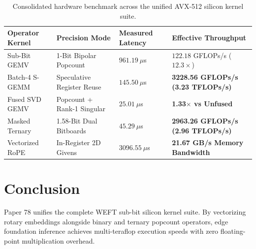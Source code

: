 \documentclass[11pt,a4paper]{article}
\begin{document}
\begin{table}[h!]
\centering
\begin{tabular}{@{}llll@{}}
\toprule
\textbf{Operator Kernel} & \textbf{Precision Mode} & \textbf{Measured Latency} & \textbf{Effective Throughput} \\ \midrule
Sub-Bit GEMV & 1-Bit Bipolar Popcount & $961.19\ \mu$s & $122.18$ GFLOPs/s ($12.3\times$) \\
Batch-4 S-GEMM & Speculative Register Reuse & $145.50\ \mu$s & \textbf{3228.56 GFLOPs/s (3.23 TFLOPs/s)} \\
Fused SVD GEMV & Popcount + Rank-1 Singular & $25.01\ \mu$s & \textbf{1.33$\times$ vs Unfused} \\
Masked Ternary & 1.58-Bit Dual Bitboards & $45.29\ \mu$s & \textbf{2963.26 GFLOPs/s (2.96 TFLOPs/s)} \\
Vectorized RoPE & In-Register 2D Givens & $3096.55\ \mu$s & \textbf{21.67 GB/s Memory Bandwidth} \\ \bottomrule
\end{tabular}
\caption{Consolidated hardware benchmark across the unified AVX-512 silicon kernel suite.}
\end{table}

\section{Conclusion}
Paper 78 unifies the complete WEFT sub-bit silicon kernel suite. By vectorizing rotary embeddings alongside binary and ternary popcount operators, edge foundation inference achieves multi-teraflop execution speeds with zero floating-point multiplication overhead.
\end{document}
